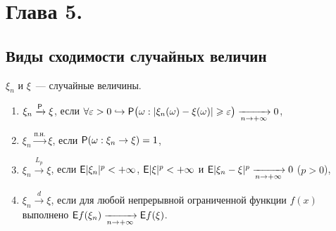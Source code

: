\section{Глава 5.}
 \subsection{Виды сходимости случайных величин}
 \begin{definition}
    $\xi_n$ и $\xi$~--- случайные величины. 
 	\begin{enumerate}
 		\item $\xi_n \xrightarrow{\P} \xi$, если 
 			$\forall \varepsilon > 0 \hookrightarrow \P\big(\omega:|\xi_n(\omega) - \xi(\omega)| 
 			\geqslant \varepsilon \big) \limn 0$,
 		\item $\xi_n \xrightarrow{\text{п.н.}} \xi$, если 
 			$\P(\omega: \xi_n \rightarrow \xi) = 1$,
 		\item $\xi_n \xrightarrow{L_p} \xi$, если $\E |\xi_n |^p < + \infty$, $\E |\xi|^p < +\infty$ и $\E | \xi_n - \xi |^p \limn 0$ ($p > 0$),
 		\item $\xi_n \xrightarrow{d} \xi$, если для любой непрерывной ограниченной функции $f(x)$ выполнено $\E f (\xi_n) \limn \E f(\xi)$.
 	\end{enumerate}
 \end{definition}
 
